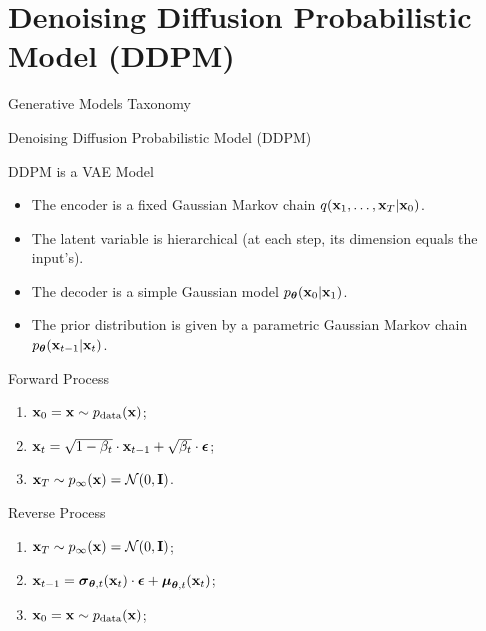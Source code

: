 \documentclass{beamer}
\begin{document}
\section{Denoising Diffusion Probabilistic Model (DDPM)}
\begin{frame}{Generative Models Taxonomy}
\end{frame}
\begin{frame}{Denoising Diffusion Probabilistic Model (DDPM)}
    \begin{block}{DDPM is a VAE Model}
        \begin{itemize}
            \item The encoder is a fixed Gaussian Markov chain $q(\mathbf{x}_1, \dots, \mathbf{x}_T | \mathbf{x}_0)$.
            \item The latent variable is hierarchical (at each step, its dimension equals the input's).
            \item The decoder is a simple Gaussian model $p_{\boldsymbol{\theta}}(\mathbf{x}_0 | \mathbf{x}_1)$.
            \item The prior distribution is given by a parametric Gaussian Markov chain $p_{\boldsymbol{\theta}}(\mathbf{x}_{t-1} | \mathbf{x}_t)$.
        \end{itemize}
    \end{block}
    \eqpause
    \begin{minipage}{0.5\linewidth}
        \begin{block}{Forward Process}
            \begin{enumerate}
                \item $\mathbf{x}_0 = \mathbf{x} \sim p_{\text{data}}(\mathbf{x})$;
                \item $\mathbf{x}_t = \sqrt{1 - \beta_t} \cdot \mathbf{x}_{t - 1} + \sqrt{\beta_t} \cdot \boldsymbol{\epsilon}$;
                \item $\mathbf{x}_T \sim p_{\infty}(\mathbf{x}) = \mathcal{N}(0, \mathbf{I})$.
            \end{enumerate}
        \end{block}
    \end{minipage}%
    \eqpause
    \begin{minipage}{0.55\linewidth}
        \begin{block}{Reverse Process}
            \begin{enumerate}
                \item $\mathbf{x}_T \sim p_{\infty}(\mathbf{x}) = \mathcal{N}(0, \mathbf{I})$;
                \item $\mathbf{x}_{t - 1} = \boldsymbol{\sigma}_{\boldsymbol{\theta}, t}(\mathbf{x}_t) \cdot \boldsymbol{\epsilon} + \boldsymbol{\mu}_{\boldsymbol{\theta}, t}(\mathbf{x}_t)$;
                \item $\mathbf{x}_0 = \mathbf{x} \sim p_{\text{data}}(\mathbf{x})$;
            \end{enumerate}
        \end{block}
    \end{minipage}
\end{frame}
\end{document}
